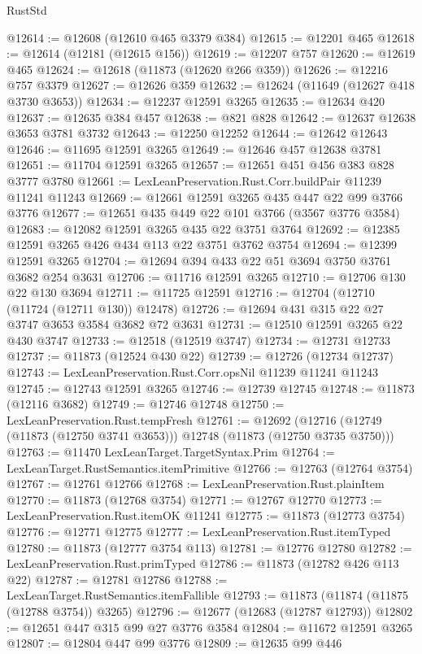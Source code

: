 \begin{lexlean}{RustStd}
\begin{coremodule}
@12614 := @12608 (@12610 @465 @3379 @384)
@12615 := @12201 @465
@12618 := @12614 (@12181 (@12615 @156))
@12619 := @12207 @757
@12620 := @12619 @465
@12624 := @12618 (@11873 (@12620 @266 @359))
@12626 := @12216 @757 @3379
@12627 := @12626 @359
@12632 := @12624 (@11649 (@12627 @418 @3730 @3653))
@12634 := @12237 @12591 @3265
@12635 := @12634 @420
@12637 := @12635 @384 @457
@12638 := @821 @828
@12642 := @12637 @12638 @3653 @3781 @3732
@12643 := @12250 @12252
@12644 := @12642 @12643
@12646 := @11695 @12591 @3265
@12649 := @12646 @457 @12638 @3781
@12651 := @11704 @12591 @3265
@12657 := @12651 @451 @456 @383 @828 @3777 @3780
@12661 := LexLeanPreservation.Rust.Corr.buildPair @11239 @11241 @11243
@12669 := @12661 @12591 @3265 @435 @447 @22 @99 @3766 @3776
@12677 := @12651 @435 @449 @22 @101 @3766 (@3567 @3776 @3584)
@12683 := @12082 @12591 @3265 @435 @22 @3751 @3764
@12692 := @12385 @12591 @3265 @426 @434 @113 @22 @3751 @3762 @3754
@12694 := @12399 @12591 @3265
@12704 := @12694 @394 @433 @22 @51 @3694 @3750 @3761 @3682 @254 @3631
@12706 := @11716 @12591 @3265
@12710 := @12706 @130 @22 @130 @3694
@12711 := @11725 @12591
@12716 := @12704 (@12710 (@11724 (@12711 @130)) @12478)
@12726 := @12694 @431 @315 @22 @27 @3747 @3653 @3584 @3682 @72 @3631
@12731 := @12510 @12591 @3265 @22 @430 @3747
@12733 := @12518 (@12519 @3747)
@12734 := @12731 @12733
@12737 := @11873 (@12524 @430 @22)
@12739 := @12726 (@12734 @12737)
@12743 := LexLeanPreservation.Rust.Corr.opsNil @11239 @11241 @11243
@12745 := @12743 @12591 @3265
@12746 := @12739 @12745
@12748 := @11873 (@12116 @3682)
@12749 := @12746 @12748
@12750 := LexLeanPreservation.Rust.tempFresh
@12761 := @12692
    (@12716 (@12749 (@11873 (@12750 @3741 @3653))) @12748 (@11873 (@12750 @3735 @3750)))
@12763 := @11470 LexLeanTarget.TargetSyntax.Prim
@12764 := LexLeanTarget.RustSemantics.itemPrimitive
@12766 := @12763 (@12764 @3754)
@12767 := @12761 @12766
@12768 := LexLeanPreservation.Rust.plainItem
@12770 := @11873 (@12768 @3754)
@12771 := @12767 @12770
@12773 := LexLeanPreservation.Rust.itemOK @11241
@12775 := @11873 (@12773 @3754)
@12776 := @12771 @12775
@12777 := LexLeanPreservation.Rust.itemTyped
@12780 := @11873 (@12777 @3754 @113)
@12781 := @12776 @12780
@12782 := LexLeanPreservation.Rust.primTyped
@12786 := @11873 (@12782 @426 @113 @22)
@12787 := @12781 @12786
@12788 := LexLeanTarget.RustSemantics.itemFallible
@12793 := @11873 (@11874 (@11875 (@12788 @3754)) @3265)
@12796 := @12677 (@12683 (@12787 @12793))
@12802 := @12651 @447 @315 @99 @27 @3776 @3584
@12804 := @11672 @12591 @3265
@12807 := @12804 @447 @99 @3776
@12809 := @12635 @99 @446

\end{coremodule}
\end{lexlean}
